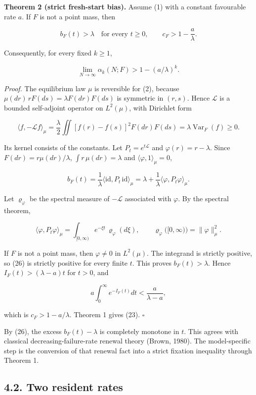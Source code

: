 \documentclass[
  british,
  11pt,
  a4paper,
]{article}
\begin{document}
\textbf{Theorem 2 (strict fresh-start bias).} Assume (1) with a constant
favourable rate \(a\). If \(F\) is not a point mass, then

\[
b_F(t)>\lambda\quad\text{for every }t\ge0,\qquad c_F>1-\frac a\lambda.
\tag{22}
\]

Consequently, for every fixed \(k\ge1\),

\[
\lim_{N\to\infty}\alpha_k(N;F)>1-(a/\lambda)^k.
\tag{23}
\]

\emph{Proof.} The equilibrium law \(\mu\) is reversible for (2), because
\(\mu(dr)\,rF(ds)=\lambda F(dr)F(ds)\) is symmetric in \((r,s)\). Hence
\(\mathcal L\) is a bounded self-adjoint operator on \(L^2(\mu)\), with
Dirichlet form

\[
\langle f,-\mathcal Lf\rangle_\mu
=\frac\lambda2\iint[f(r)-f(s)]^2F(dr)F(ds)=\lambda\operatorname{Var}_F(f)\ge0.
\tag{24}
\]

Its kernel consists of the constants. Let \(P_t=e^{t\mathcal L}\) and
\(\varphi(r)=r-\lambda\). Since \(F(dr)=r\mu(dr)/\lambda\),
\(\int r\,\mu(dr)=\lambda\) and \(\langle\varphi,1\rangle_\mu=0\),

\[
b_F(t)=\frac1\lambda\langle\mathrm{id},P_t\,\mathrm{id}\rangle_\mu
=\lambda+\frac1\lambda\langle\varphi,P_t\varphi\rangle_\mu.
\tag{25}
\]

Let \(\varrho_\varphi\) be the spectral measure of \(-\mathcal L\)
associated with \(\varphi\). By the spectral theorem,

\[
\langle\varphi,P_t\varphi\rangle_\mu=\int_{[0,\infty)}e^{-\xi t}\,\varrho_\varphi(d\xi),
\qquad\varrho_\varphi\bigl([0,\infty)\bigr)=\|\varphi\|_\mu^2.
\tag{26}
\]

If \(F\) is not a point mass, then \(\varphi\ne0\) in \(L^2(\mu)\). The
integrand is strictly positive, so (26) is strictly positive for every
finite \(t\). This proves \(b_F(t)>\lambda\). Hence
\(I_F(t)>(\lambda-a)t\) for \(t>0\), and

\[
a\int_0^\infty e^{-I_F(t)}dt<\frac a{\lambda-a},
\]

which is \(c_F>1-a/\lambda\). Theorem 1 gives (23). \(\square\)

By (26), the excess \(b_F(t)-\lambda\) is completely monotone in \(t\).
This agrees with classical decreasing-failure-rate renewal theory
(Brown, 1980). The model-specific step is the conversion of that renewal
fact into a strict fixation inequality through Theorem 1.

\subsection{4.2. Two resident rates}\label{two-resident-rates}
\end{document}
